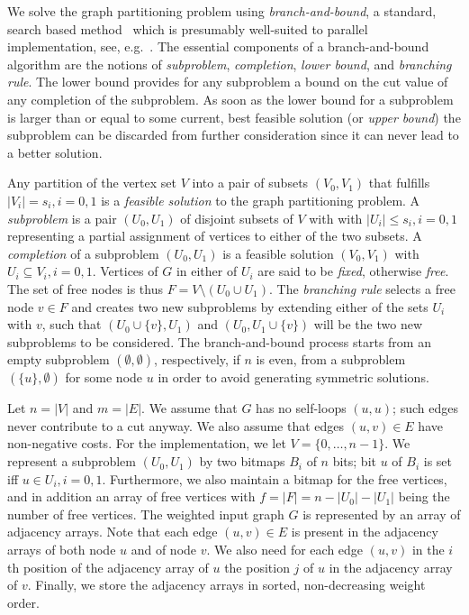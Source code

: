 \documentclass[a4paper,11pt]{article}
\begin{document}
We solve the graph partitioning problem using \emph{branch-and-bound},
a standard, search based method~\cite{PapadimitriouSteiglitz82} which
is presumably well-suited to parallel implementation, see,
e.g.~\cite{CrainicLeCunRoucairol06,GendronCrainic94,Talbi06}. The
essential components of a branch-and-bound algorithm are the notions
of \emph{subproblem}, \emph{completion}, \emph{lower bound}, and
\emph{branching rule}. The lower bound provides for any subproblem a
bound on the cut value of any completion of the subproblem. As soon as
the lower bound for a subproblem is larger than or equal to some
current, best feasible solution (or \emph{upper bound}) the subproblem
can be discarded from further consideration since it can never lead to
a better solution.

Any partition of the vertex set $V$ into a pair of subsets $(V_0,V_1)$
that fulfills $|V_i|=s_i, i=0,1$ is a \emph{feasible solution} to the
graph partitioning problem.  A \emph{subproblem} is a pair $(U_0,U_1)$
of disjoint subsets of $V$ with with $|U_i|\leq s_i,i=0,1$
representing a partial assignment of vertices to either of the two
subsets. A \emph{completion} of a subproblem $(U_0,U_1)$ is a feasible
solution $(V_0,V_1)$ with $U_i\subseteq V_i,i=0,1$. Vertices of $G$ in
either of $U_i$ are said to be \emph{fixed}, otherwise \emph{free}.
The set of free nodes is thus $F=V\setminus (U_0 \cup U_1)$. The
\emph{branching rule} selects a free node $v\in F$ and creates two new
subproblems by extending either of the sets $U_i$ with $v$, such that
$(U_0\cup\{v\},U_1)$ and $(U_0,U_1\cup\{v\})$ will be the two new
subproblems to be considered. The branch-and-bound process starts from
an empty subproblem $(\emptyset,\emptyset)$, respectively, if $n$ is
even, from a subproblem $(\{u\},\emptyset)$ for some node $u$ in order to
avoid generating symmetric solutions.

Let $n=|V|$ and $m=|E|$. We assume that $G$ has no self-loops $(u,u)$;
such edges never contribute to a cut anyway. We also assume that edges
$(u,v)\in E$ have non-negative costs. For the implementation, we let
$V=\{0,\ldots,n-1\}$. We represent a subproblem $(U_0,U_1)$ by two
bitmaps $B_i$ of $n$ bits; bit $u$ of $B_i$ is set iff $u\in U_i,
i=0,1$. Furthermore, we also maintain a bitmap for the free vertices,
and in addition an array of free vertices with $f=|F|=n-|U_0|-|U_1|$
being the number of free vertices. The weighted input graph $G$ is
represented by an array of adjacency arrays. Note that each edge
$(u,v)\in E$ is present in the adjacency arrays of both node $u$ and
of node $v$. We also need for each edge $(u,v)$ in the $i$th position
of the adjacency array of $u$ the position $j$ of $u$ in the adjacency
array of $v$. Finally, we store the adjacency arrays in sorted,
non-decreasing weight order.
\end{document}
